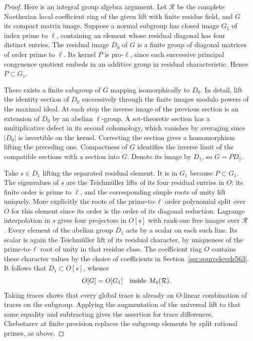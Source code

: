 \documentclass[a4paper,11pt]{article}
\theoremstyle{definition}
\theoremstyle{remark}
\numberwithin{equation}{section}
\begin{document}
\begin{proof}
Here is an integral group algebra argument. Let \(\mathcal R\)
be the complete Noetherian local coefficient ring of the
given lift with finite residue field, and \(G\) its compact
matrix image. Suppose a normal subgroup has closed image
\(G_1\) of index prime to \(\ell\), containing an element
whose residual diagonal has four distinct entries. The
residual image \(D_0\) of \(G\) is a finite group of diagonal
matrices of order prime to \(\ell\). Its kernel \(P\) is
pro-\(\ell\), since each successive principal congruence
quotient embeds in an additive group in residual
characteristic. Hence \(P\subset G_1\).

There exists a finite subgroup of \(G\) mapping
isomorphically to \(D_0\). In detail, lift the identity
section of \(D_0\) successively through the finite images
modulo powers of the maximal ideal. At each step the
inverse image of the previous section is an extension of
\(D_0\) by an abelian \(\ell\)-group. A set-theoretic
section has a multiplicative defect in its second
cohomology, which vanishes by averaging since \(|D_0|\)
is invertible on the kernel. Correcting the section
gives a homomorphism lifting the preceding one. Compactness
of \(G\) identifies the inverse limit of the compatible
sections with a section into \(G\). Denote its image by
\(D_1\), so \(G=P D_1\).

Take \(s\in D_1\) lifting the separated residual element.
It is in \(G_1\) because \(P\subset G_1\).
The eigenvalues of \(s\) are the Teichm\"uller lifts
of its four residual entries in \(O\): its finite order
is prime to \(\ell\), and the corresponding simple roots
of unity lift uniquely. More explicitly the roots of
the prime-to-\(\ell\) order polynomial split over \(O\)
for this element since its order is the order of its
diagonal reduction. Lagrange interpolation in \(s\) gives
four projectors in \(O[s]\) with rank-one free images over
\(\mathcal R\). Every element of the abelian group \(D_1\)
acts by a scalar on each such line. Its scalar is again
the Teichm\"uller lift of its residual character, by
uniqueness of the prime-to-\(\ell\) root of unity in that
residue class. The coefficient ring \(O\) contains these
character values by the choice of coefficients in
Section~\ref{sec:sourcelevels563}. It follows that
\(D_1\subset O[s]\), whence
\[
                        O[G]=O[G_1]
                \quad\hbox{inside } M_4(\mathcal R).
\]
Taking traces shows that every global trace is already an
\(O\)-linear combination of traces on the subgroup. Applying
the augmentation of the universal lift to that same equality
and subtracting gives the assertion for trace differences.
Chebotarev at finite precision replaces the subgroup elements
by split rational primes, as above.


\end{proof}
\end{document}
